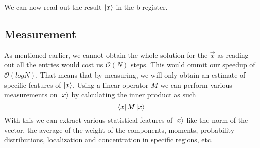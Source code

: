 We can now  read out the result $\ket x$ in the b-register.

\subsection{Measurement}
As mentioned earlier, we cannot obtain the whole solution for the $\vec x$ as reading out all the entries would cost us $\mathcal{O}(N)$ steps.
This would ommit our speedup of $\mathcal{O}(log N)$. 
That means that by measuring, we will only obtain an estimate of specific features of $\ket x$.
Using a linear operator $M$ we can perform various measurements on $\ket x$ by calculating the inner product as such
\begin{equation}
    \bra x M \ket x
\end{equation}
With this we can extract various statistical features of $\ket x$ like the norm of the vector, the average of the weight of the components, moments, probability distributions, localization and concentration in specific regions, etc.


























